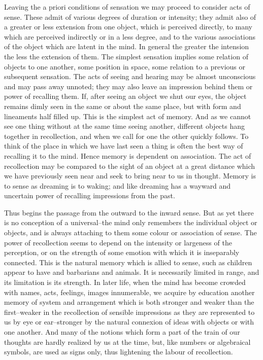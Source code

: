 Leaving the a priori conditions of sensation we may proceed to consider
acts of sense. These admit of various degrees of duration or intensity;
they admit also of a greater or less extension from one object, which is
perceived directly, to many which are perceived indirectly or in a less
degree, and to the various associations of the object which are latent
in the mind. In general the greater the intension the less the extension
of them. The simplest sensation implies some relation of objects to
one another, some position in space, some relation to a previous or
subsequent sensation. The acts of seeing and hearing may be almost
unconscious and may pass away unnoted; they may also leave an impression
behind them or power of recalling them. If, after seeing an object we
shut our eyes, the object remains dimly seen in the same or about the
same place, but with form and lineaments half filled up. This is the
simplest act of memory. And as we cannot see one thing without at
the same time seeing another, different objects hang together in
recollection, and when we call for one the other quickly follows. To
think of the place in which we have last seen a thing is often the
best way of recalling it to the mind. Hence memory is dependent on
association. The act of recollection may be compared to the sight of an
object at a great distance which we have previously seen near and seek
to bring near to us in thought. Memory is to sense as dreaming is to
waking; and like dreaming has a wayward and uncertain power of recalling
impressions from the past.

Thus begins the passage from the outward to the inward sense. But as
yet there is no conception of a universal--the mind only remembers
the individual object or objects, and is always attaching to them some
colour or association of sense. The power of recollection seems to
depend on the intensity or largeness of the perception, or on the
strength of some emotion with which it is inseparably connected. This is
the natural memory which is allied to sense, such as children appear to
have and barbarians and animals. It is necessarily limited in range, and
its limitation is its strength. In later life, when the mind has become
crowded with names, acts, feelings, images innumerable, we acquire
by education another memory of system and arrangement which is both
stronger and weaker than the first--weaker in the recollection
of sensible impressions as they are represented to us by eye or
ear--stronger by the natural connexion of ideas with objects or with one
another. And many of the notions which form a part of the train of our
thoughts are hardly realized by us at the time, but, like numbers or
algebraical symbols, are used as signs only, thus lightening the labour
of recollection.

